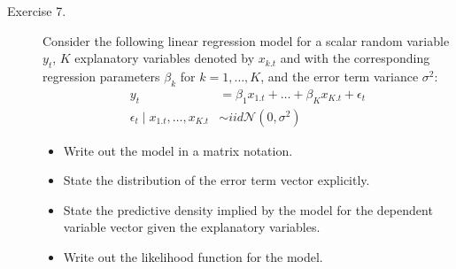 \documentclass[12pt]{article}
\begin{document}
\begin{adjustwidth}{1cm}{1cm}
\begin{description}
\newpage
\bigskip\item[Exercise 7.] Consider the following linear regression model for a scalar random variable $y_t$, $K$ explanatory variables denoted by $x_{k.t}$ and with the corresponding regression parameters $\beta_k$ for $k=1,\dots, K$, and the error term variance $\sigma^2$:
\begin{align}
y_t &= \beta_1 x_{1.t} + \dots + \beta_K x_{K.t} + \epsilon_t\\
\epsilon_t \mid x_{1.t}, \dots, x_{K.t} &\sim iid\mathcal{N}\left(0, \sigma^2\right)
\end{align}
\begin{itemize}
\item Write out the model in a matrix notation.
\item State the distribution of the error term vector explicitly.
\item State the predictive density implied by the model for the dependent variable vector given the explanatory variables.
\item Write out the likelihood function for the model.
\end{itemize}



\end{description}
\end{adjustwidth}
\end{document}
